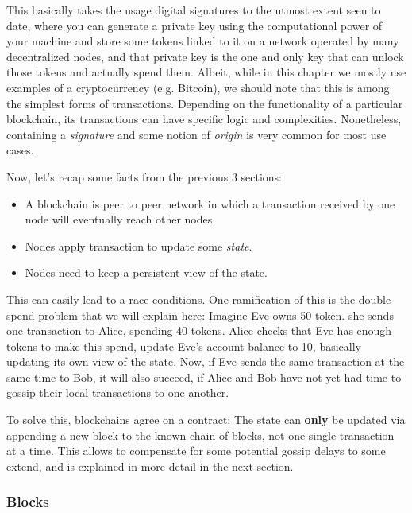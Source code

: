 This basically takes the usage digital signatures to the utmost extent seen to date, where you can
generate a private key using the computational power of your machine and store some tokens linked to
it on a network operated by many decentralized nodes, and that private key is the one and only key
that can unlock those tokens and actually spend them. Albeit, while in this chapter we mostly use
examples of a cryptocurrency (e.g. Bitcoin), we should note that this is among the simplest forms of
transactions. Depending on the functionality of a particular blockchain, its transactions can have
specific logic and complexities. Nonetheless, containing a \textit{signature} and some notion of
\textit{origin} is very common for most use cases.

Now, let's recap some facts from the previous 3 sections:

\begin{itemize}
	\item A blockchain is peer to peer network in which a transaction received by one node will
	eventually reach other nodes.
	\item Nodes apply transaction to update some \textit{state}.
	\item Nodes need to keep a persistent view of the state.
\end{itemize}

This can easily lead to a race conditions. One ramification of this is the double spend problem that
we will explain here: Imagine Eve owns 50 token. she sends one transaction to Alice, spending 40
tokens. Alice checks that Eve has enough tokens to make this spend, update Eve's account balance to
10, basically updating its own view of the state. Now, if Eve sends the same transaction at the same
time to Bob, it will also succeed, if Alice and Bob have not yet had time to gossip their local
transactions to one another.

To solve this, blockchains agree on a contract: The state can \textbf{only} be updated via appending a new
block to the known chain of blocks, not one single transaction at a time. This allows to
compensate for some potential gossip delays to some extend, and is explained in more detail in the
next section.

\subsubsection{Blocks} \label{chap_bg:subsec:block}

